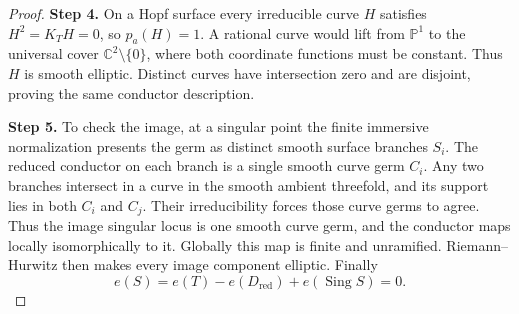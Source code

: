 \begin{proof}
\noindent\textbf{Step 4.} On a Hopf surface every irreducible curve $H$ satisfies
$H^2=K_TH=0$, so $p_a(H)=1$. A rational curve would lift from
$\mathbb P^1$ to the universal cover $\mathbb C^2\setminus\{0\}$,
where both coordinate functions must be constant. Thus $H$
is smooth elliptic. Distinct curves have intersection zero and
are disjoint, proving the same conductor description.

\noindent\textbf{Step 5.} To check the image, at a singular point the finite immersive
normalization presents the germ as distinct smooth surface
branches $S_i$. The reduced conductor on each branch is a single
smooth curve germ $C_i$. Any two branches intersect in a curve
in the smooth ambient threefold, and its support lies in both
$C_i$ and $C_j$. Their irreducibility forces those curve germs
to agree. Thus the image singular locus is one smooth curve
germ, and the conductor maps locally isomorphically to it.
Globally this map is finite and unramified. Riemann--Hurwitz
then makes every image component elliptic. Finally
\[
 e(S)=e(T)-e(D_{\mathrm{red}})+e(\operatorname{Sing}S)=0.
\]
\end{proof}

